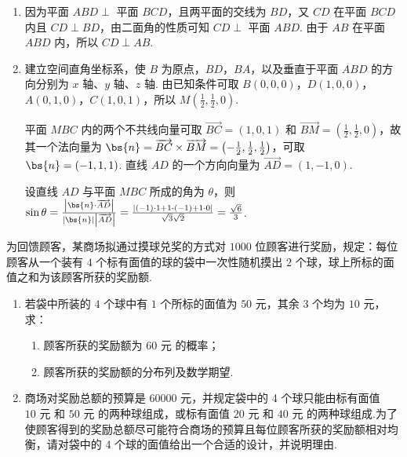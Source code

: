 \begin{solution}
\begin{enumerate}
\item 因为平面 \(ABD\perp\) 平面 \(BCD\)，且两平面的交线为 \(BD\)，又 \(CD\) 在平面 \(BCD\) 内且 \(CD\perp BD\)，由二面角的性质可知 \(CD\perp\) 平面 \(ABD\). 由于 \(AB\) 在平面 \(ABD\) 内，所以 \(CD\perp AB\).

\item 建立空间直角坐标系，使 \(B\) 为原点，\(BD\)，\(BA\)，以及垂直于平面 \(ABD\) 的方向分别为 \(x\) 轴、\(y\) 轴、\(z\) 轴. 由已知条件可取
\(B(0,0,0)\)，\(D(1,0,0)\)，\(A(0,1,0)\)，\(C(1,0,1)\)，所以 \(M\left(\frac{1}{2},\frac{1}{2},0\right)\).

平面 \(MBC\) 内的两个不共线向量可取 \(\overrightarrow{BC}=(1,0,1)\) 和 \(\overrightarrow{BM}=\left(\frac{1}{2},\frac{1}{2},0\right)\)，故其一个法向量为
\(\bs{n}=\overrightarrow{BC}\times\overrightarrow{BM}=\left(-\frac{1}{2},\frac{1}{2},\frac{1}{2}\right)\)，可取 \(\bs{n}=(-1,1,1)\). 直线 \(AD\) 的一个方向向量为 \(\overrightarrow{AD}=(1,-1,0)\).

设直线 \(AD\) 与平面 \(MBC\) 所成的角为 \(\theta\)，则
\(\sin\theta=\frac{\left|\bs{n}\cdot\overrightarrow{AD}\right|}{\left|\bs{n}\right|\left|\overrightarrow{AD}\right|}=\frac{\left|(-1)\cdot1+1\cdot(-1)+1\cdot0\right|}{\sqrt{3}\sqrt{2}}=\frac{\sqrt{6}}{3}\).
\end{enumerate}
\end{solution}

\begin{problem}
为回馈顾客，某商场拟通过摸球兑奖的方式对 \(1000\) 位顾客进行奖励，规定：每位顾客从一个装有 \(4\) 个标有面值的球的袋中一次性随机摸出 \(2\) 个球，球上所标的面值之和为该顾客所获的奖励额.

\begin{enumerate}
\item 若袋中所装的 \(4\) 个球中有 \(1\) 个所标的面值为 \(50\text{ 元}\)，其余 \(3\) 个均为 \(10\text{ 元}\)，求：

\begin{enumerate}
\item 顾客所获的奖励额为 \(60\text{ 元}\) 的概率；
\item 顾客所获的奖励额的分布列及数学期望.
\end{enumerate}

\item 商场对奖励总额的预算是 \(60000\text{ 元}\)，并规定袋中的 4 个球只能由标有面值 \(10\text{ 元}\) 和 \(50\text{ 元}\) 的两种球组成，或标有面值 \(20\text{ 元}\) 和 \(40\text{ 元}\) 的两种球组成.为了使顾客得到的奖励总额尽可能符合商场的预算且每位顾客所获的奖励额相对均衡，请对袋中的 4 个球的面值给出一个合适的设计，并说明理由.
\end{enumerate}
\end{problem}

